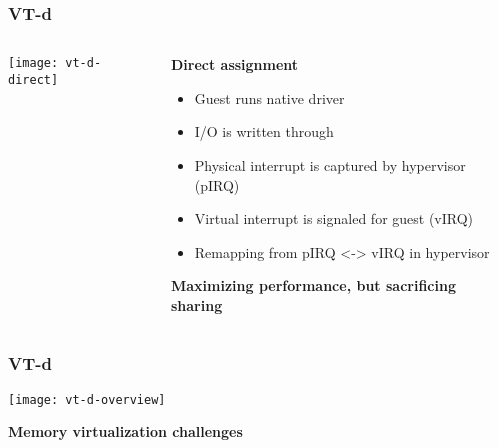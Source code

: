 \begin{frame}[plain]
	\frametitle{VT-d}
	

	\begin{columns}
	
	\begin{column}{.4\textwidth}
		
		\texttt{[image: vt-d-direct]}
		
	\end{column}
	
	\begin{column}{.5\textwidth}
		
	\textbf{Direct assignment}
	
	
	
	\begin{itemize}
		\item Guest runs native driver  
		\item I/O is written through
		\item Physical interrupt is captured by hypervisor (pIRQ)
		\item Virtual interrupt is signaled for guest (vIRQ)
		\item Remapping from pIRQ <-> vIRQ in hypervisor
	\end{itemize} 
	
	\textbf{Maximizing performance, but sacrificing sharing}
	
    \end{column}


\end{columns}
	
\end{frame}


\begin{frame}[plain]
	\frametitle{VT-d}
	
	\centering
	\texttt{[image: vt-d-overview]}
	
	
	\textbf{Memory virtualization challenges}
	
	
	
\end{frame}

